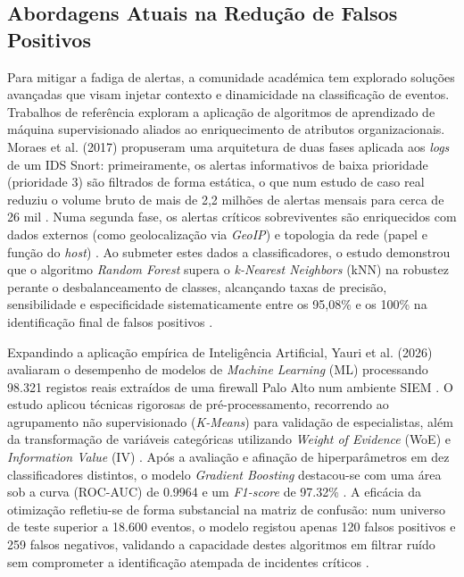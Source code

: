 \documentclass[12pt,a4paper]{article}
\begin{document}
\subsection{Abordagens Atuais na Redução de Falsos Positivos}
Para mitigar a fadiga de alertas, a comunidade académica tem explorado soluções avançadas que visam injetar contexto e dinamicidade na classificação de eventos. Trabalhos de referência exploram a aplicação de algoritmos de aprendizado de máquina supervisionado aliados ao enriquecimento de atributos organizacionais. Moraes et al. (2017) propuseram uma arquitetura de duas fases aplicada aos \textit{logs} de um IDS Snort: primeiramente, os alertas informativos de baixa prioridade (prioridade 3) são filtrados de forma estática, o que num estudo de caso real reduziu o volume bruto de mais de 2,2 milhões de alertas mensais para cerca de 26 mil \cite{moraes2017}. Numa segunda fase, os alertas críticos sobreviventes são enriquecidos com dados externos (como geolocalização via \textit{GeoIP}) e topologia da rede (papel e função do \textit{host}) \cite{moraes2017}. Ao submeter estes dados a classificadores, o estudo demonstrou que o algoritmo \textit{Random Forest} supera o \textit{k-Nearest Neighbors} (kNN) na robustez perante o desbalanceamento de classes, alcançando taxas de precisão, sensibilidade e especificidade sistematicamente entre os 95,08\% e os 100\% na identificação final de falsos positivos \cite{moraes2017}. 

Expandindo a aplicação empírica de Inteligência Artificial, Yauri et al. (2026) avaliaram o desempenho de modelos de \textit{Machine Learning} (ML) processando 98.321 registos reais extraídos de uma firewall Palo Alto num ambiente SIEM \cite{yauri2026}. O estudo aplicou técnicas rigorosas de pré-processamento, recorrendo ao agrupamento não supervisionado (\textit{K-Means}) para validação de especialistas, além da transformação de variáveis categóricas utilizando \textit{Weight of Evidence} (WoE) e \textit{Information Value} (IV) \cite{yauri2026}. Após a avaliação e afinação de hiperparâmetros em dez classificadores distintos, o modelo \textit{Gradient Boosting} destacou-se com uma área sob a curva (ROC-AUC) de 0.9964 e um \textit{F1-score} de 97.32\% \cite{yauri2026}. A eficácia da otimização refletiu-se de forma substancial na matriz de confusão: num universo de teste superior a 18.600 eventos, o modelo registou apenas 120 falsos positivos e 259 falsos negativos, validando a capacidade destes algoritmos em filtrar ruído sem comprometer a identificação atempada de incidentes críticos \cite{yauri2026}.
\end{document}
